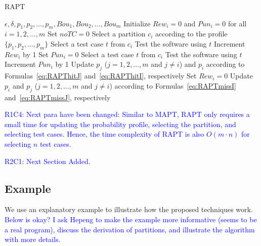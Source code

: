 \documentclass[10pt,journal,compsoc]{IEEEtran}
\begin{document}
\begin{algorithm}
	\caption{RAPT}
	\label{alg:RAPT}
	\begin{algorithmic}[1]
		\renewcommand{\algorithmicrequire}{\textbf{Input:}}
		\renewcommand{\algorithmicensure}{\textbf{Output:}}
		\renewcommand{\algorithmicendwhile}{\algorithmicend\_\algorithmicwhile}
		\renewcommand{\algorithmicendfor}{\algorithmicend\_\algorithmicfor}
		\renewcommand{\algorithmicendif}{\algorithmicend\_\algorithmicif}
		\renewcommand{\algorithmicthen}{}
		\renewcommand{\algorithmicdo}{}
		\REQUIRE $\epsilon, \delta, p_1, p_2, \ldots, p_m, Bou_1, Bou_2, \ldots, Bou_m$
		\STATE Initialize $Rew_i = 0$ and $Pun_i = 0$ for all $i = 1, 2, \ldots, m$
		\STATE Set $noTC = 0$
		\STATE Select a partition $c_i$ according to the profile $\{p_1, p_2, \ldots, p_m\}$
		\STATE Select a test case $t$ from $c_i$
		\STATE Test the software using $t$
		\STATE Increment $Rew_i$ by 1
		\STATE Set $Pun_i = 0$
		\STATE Select a test case $t$ from $c_i$
		\STATE Test the software using $t$
		\ENDWHILE
		\STATE Increment $Pun_i$ by 1
		\STATE Update $p_j$ ($j = 1, 2, \ldots, m$ and $j \neq i$) and $p_i$ according to Formulas~\ref{eq:RAPThitJ} and~\ref{eq:RAPThitI}, respectively
		\STATE Set $Rew_i = 0$
		\ELSE
		\STATE Update $p_i$ and $p_j$ ($j = 1, 2, \ldots, m$ and $j \neq i$) according to Formulas~\ref{eq:RAPTmissI} and~\ref{eq:RAPTmissJ}, respectively
		\ENDIF
		\ENDWHILE
	\end{algorithmic}
\end{algorithm}


\textcolor{blue}{R1C4: Next para have been changed:
Similar to MAPT, RAPT only requires a small time for updating the probability profile, selecting the partition, and selecting test cases. Hence, the time complexity of RAPT is also $O(m \cdot n)$ for selecting $n$ test cases.}

\textcolor{blue}{R2C1: Next Section Added.}
\subsection{Example}
We use an explanatory example to illustrate how the proposed techniques work. \textcolor{blue}{Below is okay? I ask Hepeng to make the example more informative (seems to be a real program), discuss the derivation of partitions, and illustrate the algorithm with more details.}
\end{document}
